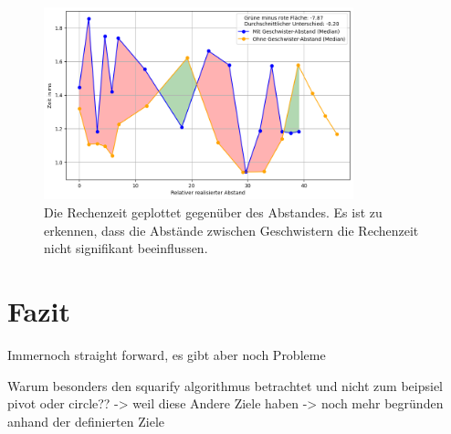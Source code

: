 \begin{figure}
    \centering
    \includegraphics[width=0.8\textwidth]{images/improve/GeschwisterZeit.png}
    \caption{Die Rechenzeit geplottet gegenüber des Abstandes. Es ist zu erkennen, dass die Abstände zwischen Geschwistern die Rechenzeit nicht signifikant beeinflussen.}
    \label{fig:GeschwisterKnotenZeit}
\end{figure}


\section{Fazit}
Immernoch straight forward, es gibt aber noch Probleme 

Warum besonders den squarify algorithmus betrachtet und nicht zum beipsiel pivot oder circle?? -> weil diese Andere Ziele haben -> noch mehr begründen anhand der definierten Ziele







